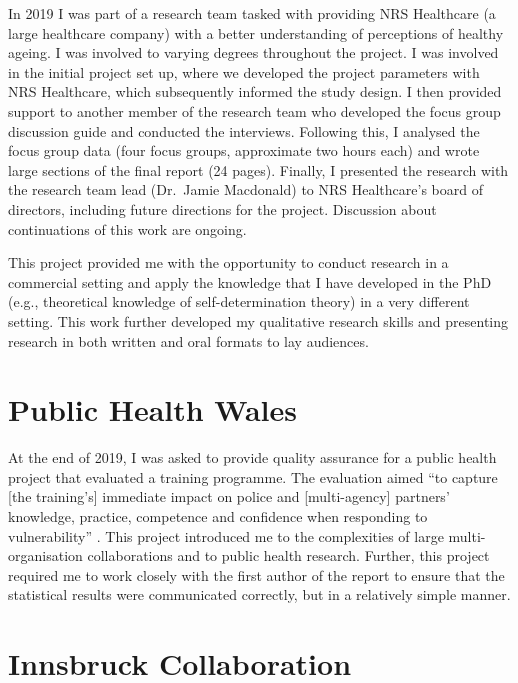 \documentclass[
  12pt,
  a4paper,
]{book}
\begin{document}
In 2019 I was part of a research team tasked with providing NRS Healthcare (a large healthcare company) with a better understanding of perceptions of healthy ageing. I was involved to varying degrees throughout the project. I was involved in the initial project set up, where we developed the project parameters with NRS Healthcare, which subsequently informed the study design. I then provided support to another member of the research team who developed the focus group discussion guide and conducted the interviews. Following this, I analysed the focus group data (four focus groups, approximate two hours each) and wrote large sections of the final report (24 pages). Finally, I presented the research with the research team lead (Dr.~Jamie Macdonald) to NRS Healthcare's board of directors, including future directions for the project. Discussion about continuations of this work are ongoing.

This project provided me with the opportunity to conduct research in a commercial setting and apply the knowledge that I have developed in the PhD (e.g., theoretical knowledge of self-determination theory) in a very different setting. This work further developed my qualitative research skills and presenting research in both written and oral formats to lay audiences.

\hypertarget{public-health-wales}{%
\section{Public Health Wales}\label{public-health-wales}}

At the end of 2019, I was asked to provide quality assurance for a public health project that evaluated a training programme. The evaluation aimed ``to capture {[}the training's{]} immediate impact on police and {[}multi-agency{]} partners' knowledge, practice, competence and confidence when responding to vulnerability'' \citep{Glendinning2020}. This project introduced me to the complexities of large multi-organisation collaborations and to public health research. Further, this project required me to work closely with the first author of the report to ensure that the statistical results were communicated correctly, but in a relatively simple manner.

\hypertarget{innsbruck-collaboration}{%
\section{Innsbruck Collaboration}\label{innsbruck-collaboration}}
\end{document}
